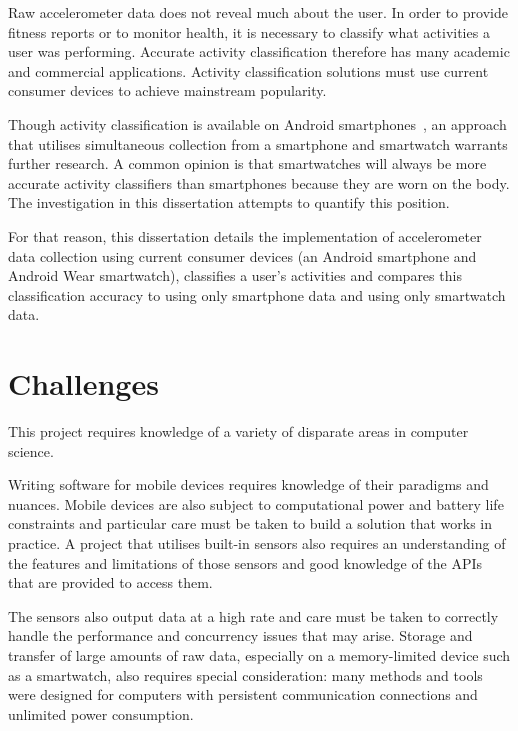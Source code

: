     Raw accelerometer data does not reveal much about the user. In order to provide fitness reports or to monitor health, it is necessary to classify what activities a user was performing. Accurate activity classification therefore has many academic and commercial applications. Activity classification solutions must use current consumer devices to achieve mainstream popularity. 
    
    Though 
    activity classification is available on Android smartphones~\cite{androidActivityRecognitionApi}, an approach that
    utilises simultaneous collection from a smartphone and smartwatch warrants further research. A common opinion is that smartwatches will always be more accurate activity classifiers than smartphones because they are worn on the body. The investigation in this dissertation attempts to quantify this position.
     
    For that reason, this dissertation details the implementation of accelerometer data collection using current 
    consumer devices (an Android smartphone and Android Wear smartwatch), classifies a user's 
    activities and compares this classification accuracy to using only smartphone data and using 
    only smartwatch data. 
    
  \section{Challenges}
  \label{sec:intro-challenges}
    This project requires knowledge of a variety of disparate areas in computer science. 
    
    Writing software for mobile devices requires knowledge of their paradigms and nuances.
    Mobile devices are also subject to computational power and battery life constraints \cite{rachuri2011sociablesense} and   
    particular care must be taken to build a solution that works in practice.  
    A project that utilises built-in sensors also requires an understanding of the features and 
    limitations of those sensors and good knowledge of the APIs that are provided to access them.

    The sensors also output data at a high rate and care must be taken to correctly handle the
    performance and concurrency issues that may arise. Storage and transfer of large amounts of
    raw data, especially on a memory-limited device such as a smartwatch, also requires special
    consideration: many methods and tools were designed for computers with persistent communication connections and unlimited power consumption.
    
